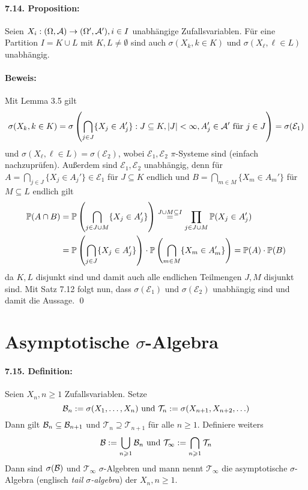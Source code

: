\documentclass[12pt]{report}
\begin{document}
\paragraph{7.14. Proposition:}Seien $X_i:(\Omega,\mathcal{A})\to(\Omega',\mathcal{A}'),i\in I$ unabh\"angige Zufallsvariablen. F\"ur eine Partition $I=K\cup L$ mit $K,L\neq\emptyset$ sind auch $\sigma(X_k,k\in K)$ und $\sigma(X_\ell,\ell\in L)$ unabh\"angig. 

\paragraph{Beweis:}Mit Lemma 3.5 gilt
$$\sigma(X_k,k\in K)=\sigma\left(\bigcap_{j\in J}\{X_j\in A_j'\}:J\subseteq K,|J|<\infty,A_j'\in\mathcal{A}' \text{ f\"ur }j\in J\right)=\sigma(\mathcal{E}_1)$$
und $\sigma(X_\ell,\ell\in L)=\sigma(\mathcal{E}_2)$, wobei $\mathcal{E}_1,\mathcal{E}_2$ $\pi$-Systeme sind (einfach nachzupr\"ufen). Au\ss{}erdem sind $\mathcal{E}_1,\mathcal{E}_2$ unabh\"angig, denn f\"ur $\displaystyle A=\bigcap_{j\in J}\{X_j\in A_j'\}\in \mathcal{E}_1$ f\"ur $J\subseteq K$ endlich und $\displaystyle B=\bigcap_{m\in M}\{X_m\in A_m'\}$ f\"ur $M\subseteq L$ endlich gilt
\begin{align*}
    \mathbb{P}(A\cap B)&=\mathbb{P}\left(\bigcap_{j\in J\cup M}\{X_j\in A_j'\}\right)\overset{J\cup M\subseteq I}{=}\prod_{j\in J\cup M}\mathbb{P}(X_j\in A_j')\\
    &=\mathbb{P}\left(\bigcap_{j\in J}\{X_j\in A_j'\}\right)\cdot\mathbb{P}\left(\bigcap_{m\in M}\{X_m\in A_m'\}\right)=\mathbb{P}(A)\cdot\mathbb{P}(B)
\end{align*}
da $K,L$ disjunkt sind und damit auch alle endlichen Teilmengen $J,M$ disjunkt sind. Mit Satz 7.12 folgt nun, dass $\sigma(\mathcal{E}_1)$ und $\sigma(\mathcal{E}_2)$ unabh\"angig sind und damit die Aussage. \qed

\section*{Asymptotische $\sigma$-Algebra}

\paragraph{7.15. Definition:}Seien $X_n,n\geq1$ Zufallsvariablen. Setze 
$$\mathcal{B}_n:=\sigma(X_1,\hdots,X_n)\text{ und }\mathcal{T}_n:=\sigma(X_{n+1},X_{n+2},\hdots)$$
Dann gilt $\mathcal{B}_n\subseteq\mathcal{B}_{n+1}$ und $\mathcal{T}_n\supseteq\mathcal{T}_{n+1}$ f\"ur alle $n\geq1$. Definiere weiters
$$\mathcal{B}:=\bigcup_{n\geqslant1}\mathcal{B}_n\text{ und }\mathcal{T}_\infty:=\bigcap_{n\geqslant1}\mathcal{T}_n$$
Dann sind $\sigma(\mathcal{B})$ und $\mathcal{T}_\infty$ $\sigma$-Algebren und mann nennt $\mathcal{T}_\infty$ die asymptotische $\sigma$-Algebra (englisch \textit{tail $\sigma$-algebra}) der $X_n,n\geq1$. 
\end{document}
